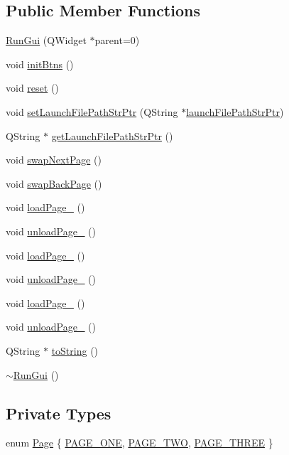 \subsection*{Public Member Functions}
\begin{DoxyCompactItemize}
\item 
\hyperlink{class_run_gui_af41e6138b6401d18ff8a3f8db680cd43}{Run\-Gui} (Q\-Widget $\ast$parent=0)
\item 
void \hyperlink{class_run_gui_ad78d722a104e6e893b57642340c3b937}{init\-Btns} ()
\item 
void \hyperlink{class_run_gui_ac732d44ad96c7d14f1666d1193c43d65}{reset} ()
\item 
void \hyperlink{class_run_gui_a8b202a47e593e0aa6d18d33c6c857308}{set\-Launch\-File\-Path\-Str\-Ptr} (Q\-String $\ast$\hyperlink{class_run_gui_a3766ac7d4bfae38eb0d9f535f0d9bcf5}{launch\-File\-Path\-Str\-Ptr})
\item 
Q\-String $\ast$ \hyperlink{class_run_gui_a2dd3619058d2cb92433d4f000bf97851}{get\-Launch\-File\-Path\-Str\-Ptr} ()
\item 
void \hyperlink{class_run_gui_ac4c0fed5ead22a1dc40d5bebe2d6f176}{swap\-Next\-Page} ()
\item 
void \hyperlink{class_run_gui_a469be74273ddc6441a9f87e65d3ab2c9}{swap\-Back\-Page} ()
\item 
void \hyperlink{class_run_gui_a381d265f46ec8473a7858974a19674c5}{load\-Page\-\_} ()
\item 
void \hyperlink{class_run_gui_ab68852933855016b114c795ab494d8bb}{unload\-Page\-\_} ()
\item 
void \hyperlink{class_run_gui_a8048ffff4b07771419e8c88ea250d2f2}{load\-Page\-\_} ()
\item 
void \hyperlink{class_run_gui_a3192d643a700244e066f3e0ca4389c4b}{unload\-Page\-\_} ()
\item 
void \hyperlink{class_run_gui_a5defb3e688b1b3f22d50c5b9389910c0}{load\-Page\-\_} ()
\item 
void \hyperlink{class_run_gui_a410e373ff032fb779b52b1dd501c3128}{unload\-Page\-\_} ()
\item 
Q\-String $\ast$ \hyperlink{class_run_gui_a4a3470c32bf986ad552bc225d039e5bb}{to\-String} ()
\item 
\hyperlink{class_run_gui_a22945ade9579f8d0e44f848c51a0a0b0}{$\sim$\-Run\-Gui} ()
\end{DoxyCompactItemize}
\subsection*{Private Types}
\begin{DoxyCompactItemize}
\item 
enum \hyperlink{class_run_gui_acb4a3da6e31619ee4b0ac8c8f9cb64a3}{Page} \{ \hyperlink{class_run_gui_acb4a3da6e31619ee4b0ac8c8f9cb64a3aad59b834aebc523b21fc270d5d5fa41e}{P\-A\-G\-E\-\_\-\-O\-N\-E}, 
\hyperlink{class_run_gui_acb4a3da6e31619ee4b0ac8c8f9cb64a3a141aac6dec6d5f36540fcaf2fe34f343}{P\-A\-G\-E\-\_\-\-T\-W\-O}, 
\hyperlink{class_run_gui_acb4a3da6e31619ee4b0ac8c8f9cb64a3a58cde07651bfba4a62997dc50a95fba1}{P\-A\-G\-E\-\_\-\-T\-H\-R\-E\-E}
 \}
\end{DoxyCompactItemize}
